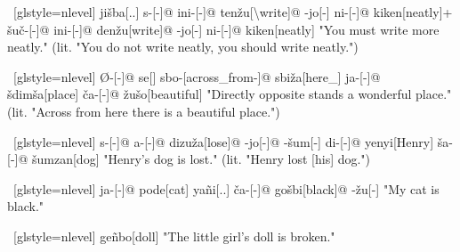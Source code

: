 \ex~[glstyle=nlevel]
\begingl
\glpreamble {}
\endpreamble
ji\v{s}ba[{\Spol}.{\Hg}.{\Erg}]
s-[{\Ind}-]@
ini-[{\Hab}-]@
ten\v{z}u[{\Neg}\textbackslash write]@
-jo[-\Hg]
ni-[{\Hab}-]@
kiken[neatly]+
\v{s}u\v{c}-[{\Deo}-]@
ini-[{\Hab}-]@
den\v{z}u[write]@
-jo[-\Hg]
ni-[{\Hab}-]@
kiken[neatly]
\glft "You must write more neatly." (lit. "You do not write neatly, you should write neatly.")
\endgl
\xe

\ex~[glstyle=nlevel]
\begingl
\glpreamble {}
\endpreamble
Ø-[{\Ind}-]@
se[{\Cop}]
sbo-[across\_from-]@
sbi\v{z}a[here\_{\Prox}]
ja-[{\Nom}-]@
\v{s}dim\v{s}a[place]
\v{c}a-[{\Nom}-]@
\v{z}u\v{s}o[beautiful]
\glft "Directly opposite stands a wonderful place." (lit. "Across from here there is a beautiful place.")
\endgl
\xe

\ex~[glstyle=nlevel]
\begingl
\glpreamble {}
\endpreamble
s-[{\Ind}-]@
a-[{\Prog}-]@
dizu\v{z}a[lose]@
-jo[-{\Hg}]@
-\v{s}um[-{\An}]
di-[{\Erg}-]@
yenyi[Henry]
\v{s}a-[{\Acc}-]@
\v{s}umzan[dog]
\glft "Henry's dog is lost." (lit. "Henry lost [his] dog.")
\endgl
\xe

\ex~[glstyle=nlevel]
\begingl
\glpreamble {}
\endpreamble
ja-[{\Nom}-]@
pode[cat]
yañi[{\Fex}.{\Hg}.{\Gen}]
\v{c}a-[{\Nom}-]@
go\v{s}bi[black]@
-\v{z}u[-{\An}]
\glft "My cat is black."
\endgl
\xe

\ex~[glstyle=nlevel]
\begingl
\glpreamble \SGwithRom{}
\endpreamble
geñbo[doll]
\glft "The little girl's doll is broken."
\endgl
\xe


\endgroup
\iffalse


\ex~[glstyle=nlevel]
\begingl
\glpreamble \SGwithRom{}
\endpreamble

\glft ""
\endgl
\xe


\fi
